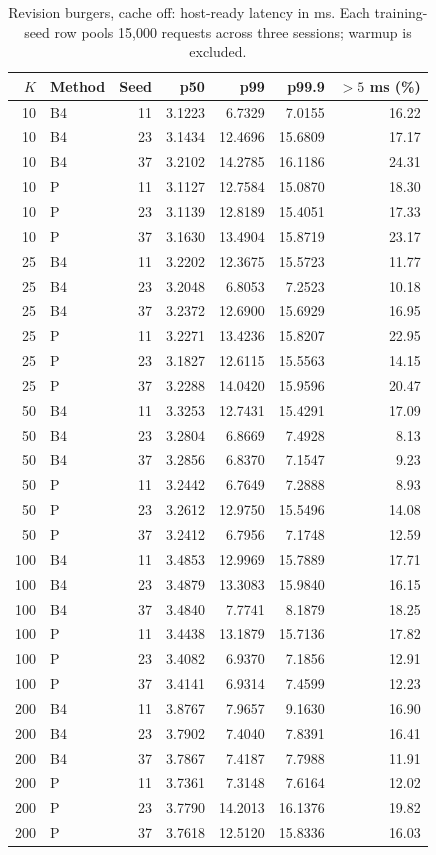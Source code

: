 \begin{table}[ht]
\centering\small
\caption{Revision burgers, cache off: host-ready latency in ms. Each training-seed row pools 15,000 requests across three sessions; warmup is excluded.}\label{tab:e2_seed_burgers_off}
\begin{tabular}{@{}rlrrrrr@{}}\toprule
$K$ & Method & Seed & p50 & p99 & p99.9 & $>5$ ms (\%)\\\midrule
10 & B4 & 11 & 3.1223 & 6.7329 & 7.0155 & 16.22\\
10 & B4 & 23 & 3.1434 & 12.4696 & 15.6809 & 17.17\\
10 & B4 & 37 & 3.2102 & 14.2785 & 16.1186 & 24.31\\
10 & P & 11 & 3.1127 & 12.7584 & 15.0870 & 18.30\\
10 & P & 23 & 3.1139 & 12.8189 & 15.4051 & 17.33\\
10 & P & 37 & 3.1630 & 13.4904 & 15.8719 & 23.17\\
25 & B4 & 11 & 3.2202 & 12.3675 & 15.5723 & 11.77\\
25 & B4 & 23 & 3.2048 & 6.8053 & 7.2523 & 10.18\\
25 & B4 & 37 & 3.2372 & 12.6900 & 15.6929 & 16.95\\
25 & P & 11 & 3.2271 & 13.4236 & 15.8207 & 22.95\\
25 & P & 23 & 3.1827 & 12.6115 & 15.5563 & 14.15\\
25 & P & 37 & 3.2288 & 14.0420 & 15.9596 & 20.47\\
50 & B4 & 11 & 3.3253 & 12.7431 & 15.4291 & 17.09\\
50 & B4 & 23 & 3.2804 & 6.8669 & 7.4928 & 8.13\\
50 & B4 & 37 & 3.2856 & 6.8370 & 7.1547 & 9.23\\
50 & P & 11 & 3.2442 & 6.7649 & 7.2888 & 8.93\\
50 & P & 23 & 3.2612 & 12.9750 & 15.5496 & 14.08\\
50 & P & 37 & 3.2412 & 6.7956 & 7.1748 & 12.59\\
100 & B4 & 11 & 3.4853 & 12.9969 & 15.7889 & 17.71\\
100 & B4 & 23 & 3.4879 & 13.3083 & 15.9840 & 16.15\\
100 & B4 & 37 & 3.4840 & 7.7741 & 8.1879 & 18.25\\
100 & P & 11 & 3.4438 & 13.1879 & 15.7136 & 17.82\\
100 & P & 23 & 3.4082 & 6.9370 & 7.1856 & 12.91\\
100 & P & 37 & 3.4141 & 6.9314 & 7.4599 & 12.23\\
200 & B4 & 11 & 3.8767 & 7.9657 & 9.1630 & 16.90\\
200 & B4 & 23 & 3.7902 & 7.4040 & 7.8391 & 16.41\\
200 & B4 & 37 & 3.7867 & 7.4187 & 7.7988 & 11.91\\
200 & P & 11 & 3.7361 & 7.3148 & 7.6164 & 12.02\\
200 & P & 23 & 3.7790 & 14.2013 & 16.1376 & 19.82\\
200 & P & 37 & 3.7618 & 12.5120 & 15.8336 & 16.03\\
\bottomrule\end{tabular}
\end{table}

